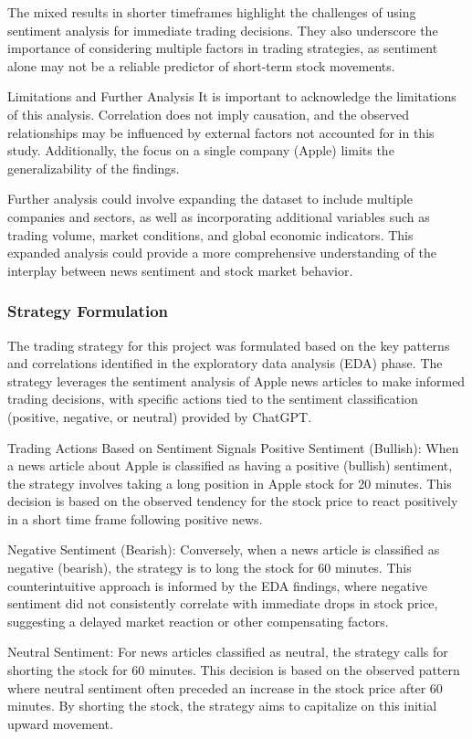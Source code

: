 The mixed results in shorter timeframes highlight the challenges of using sentiment analysis for immediate trading decisions. They also underscore the importance of considering multiple factors in trading strategies, as sentiment alone may not be a reliable predictor of short-term stock movements.

Limitations and Further Analysis
It is important to acknowledge the limitations of this analysis. Correlation does not imply causation, and the observed relationships may be influenced by external factors not accounted for in this study. Additionally, the focus on a single company (Apple) limits the generalizability of the findings.

Further analysis could involve expanding the dataset to include multiple companies and sectors, as well as incorporating additional variables such as trading volume, market conditions, and global economic indicators. This expanded analysis could provide a more comprehensive understanding of the interplay between news sentiment and stock market behavior.


\subsubsection{Strategy Formulation}
The trading strategy for this project was formulated based on the key patterns and correlations identified in the exploratory data analysis (EDA) phase. The strategy leverages the sentiment analysis of Apple news articles to make informed trading decisions, with specific actions tied to the sentiment classification (positive, negative, or neutral) provided by ChatGPT.

Trading Actions Based on Sentiment Signals
Positive Sentiment (Bullish): When a news article about Apple is classified as having a positive (bullish) sentiment, the strategy involves taking a long position in Apple stock for 20 minutes. This decision is based on the observed tendency for the stock price to react positively in a short time frame following positive news.

Negative Sentiment (Bearish): Conversely, when a news article is classified as negative (bearish), the strategy is to long the stock for 60 minutes. This counterintuitive approach is informed by the EDA findings, where negative sentiment did not consistently correlate with immediate drops in stock price, suggesting a delayed market reaction or other compensating factors.

Neutral Sentiment: For news articles classified as neutral, the strategy calls for shorting the stock for 60 minutes. This decision is based on the observed pattern where neutral sentiment often preceded an increase in the stock price after 60 minutes. By shorting the stock, the strategy aims to capitalize on this initial upward movement.

